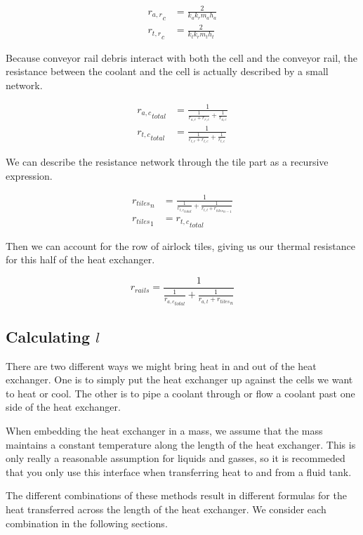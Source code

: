 \documentclass{article}
\numberwithin{equation}{subsection}
\theoremstyle{remark}
\begin{document}
\begin{align}
{r_{a,r}}_{c} &= \frac{2}{k_{a} k_{r} m_{a} h_{a}} \\
{r_{t,r}}_{c} &= \frac{2}{k_{t} k_{r} m_{t} h_{t}}
\end{align}

Because conveyor rail debris interact with both the cell and the conveyor rail, the resistance between the coolant and the cell is actually described by a small network.

\begin{align}
{r_{a,c}}_{total} &= \frac{1}{\frac{1}{r_{a,r} + r_{r,c}} + \frac{1}{r_{a,c}}} \\
{r_{t,c}}_{total} &= \frac{1}{\frac{1}{r_{t,r} + r_{t,c}} + \frac{1}{r_{t,c}}}
\end{align}

We can describe the resistance network through the tile part as a recursive expression.

\begin{align}
{r_{tiles}}_{n} &= \frac{1}{\frac{1}{{r_{t,c}}_{total}} + \frac{1}{r_{t,t} + {r_{tiles}}_{n - 1}}} \\
{r_{tiles}}_{1} &= {r_{t,c}}_{total}
\end{align}

Then we can account for the row of airlock tiles, giving us our thermal resistance for this half of the heat exchanger.

\begin{equation}
r_{rails} = \frac{1}{\frac{1}{{r_{a,c}}_{total}} + \frac{1}{r_{a,t} + {r_{tiles}}_{n}}}
\end{equation}

\subsection{Calculating \(l\)}

There are two different ways we might bring heat in and out of the heat exchanger.
One is to simply put the heat exchanger up against the cells we want to heat or cool.
The other is to pipe a coolant through or flow a coolant past one side of the heat exchanger.

When embedding the heat exchanger in a mass, we assume that the mass maintains a constant temperature along the length of the heat exchanger.
This is only really a reasonable assumption for liquids and gasses, so it is recommeded that you only use this interface when transferring heat to and from a fluid tank.

The different combinations of these methods result in different formulas for the heat transferred across the length of the heat exchanger.
We consider each combination in the following sections.
\end{document}
